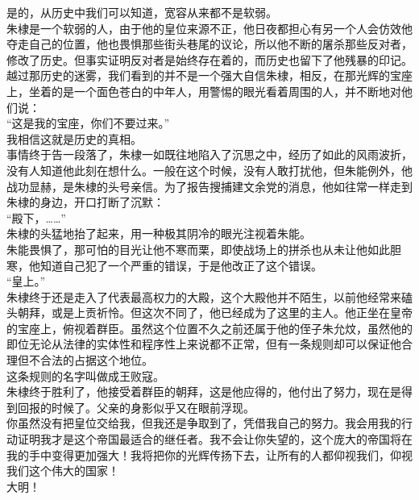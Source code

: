 \begin{multicols}{\theparacolNo}
是的，从历史中我们可以知道，宽容从来都不是软弱。\\

朱棣是一个软弱的人，由于他的皇位来源不正，他日夜都担心有另一个人会仿效他夺走自己的位置，他也畏惧那些街头巷尾的议论，所以他不断的屠杀那些反对者，修改了历史。但事实证明反对者是始终存在着的，而历史也留下了他残暴的印记。\\

越过那历史的迷雾，我们看到的并不是一个强大自信朱棣，相反，在那光辉的宝座上，坐着的是一个面色苍白的中年人，用警惕的眼光看着周围的人，并不断地对他们说：\\

“这是我的宝座，你们不要过来。”\\

我相信这就是历史的真相。\\

事情终于告一段落了，朱棣一如既往地陷入了沉思之中，经历了如此的风雨波折，没有人知道他此刻在想什么。一般在这个时候，没有人敢打扰他，但朱能例外，他战功显赫，是朱棣的头号亲信。为了报告搜捕建文余党的消息，他如往常一样走到朱棣的身边，开口打断了沉默：\\

“殿下，……”\\

朱棣的头猛地抬了起来，用一种极其阴冷的眼光注视着朱能。\\

朱能畏惧了，那可怕的目光让他不寒而栗，即使战场上的拼杀也从未让他如此胆寒，他知道自己犯了一个严重的错误，于是他改正了这个错误。\\

“皇上。”\\

朱棣终于还是走入了代表最高权力的大殿，这个大殿他并不陌生，以前他经常来磕头朝拜，或是上贡祈怜。但这次不同了，他已经成为了这里的主人。他正坐在皇帝的宝座上，俯视着群臣。虽然这个位置不久之前还属于他的侄子朱允炆，虽然他的即位无论从法律的实体性和程序性上来说都不正常，但有一条规则却可以保证他合理但不合法的占据这个地位。\\

这条规则的名字叫做成王败寇。\\

朱棣终于胜利了，他接受着群臣的朝拜，这是他应得的，他付出了努力，现在是得到回报的时候了。父亲的身影似乎又在眼前浮现。\\

你虽然没有把皇位交给我，但我还是争取到了，凭借我自己的努力。我会用我的行动证明我才是这个帝国最适合的继任者。我不会让你失望的，这个庞大的帝国将在我的手中变得更加强大！我将把你的光辉传扬下去，让所有的人都仰视我们，仰视我们这个伟大的国家！\\

大明！\\
\ifnum{}
	\end{multicols}
\fi
